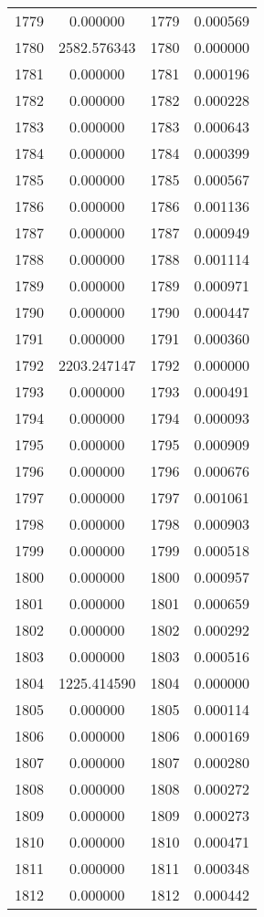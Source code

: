 \documentclass[12pt]{article}
\begin{document}
\begin{longtable}{@{}cccc@{}}
1779 & 0.000000 & 1779 & 0.000569 \\
1780 & 2582.576343 & 1780 & 0.000000 \\
1781 & 0.000000 & 1781 & 0.000196 \\
1782 & 0.000000 & 1782 & 0.000228 \\
1783 & 0.000000 & 1783 & 0.000643 \\
1784 & 0.000000 & 1784 & 0.000399 \\
1785 & 0.000000 & 1785 & 0.000567 \\
1786 & 0.000000 & 1786 & 0.001136 \\
1787 & 0.000000 & 1787 & 0.000949 \\
1788 & 0.000000 & 1788 & 0.001114 \\
1789 & 0.000000 & 1789 & 0.000971 \\
1790 & 0.000000 & 1790 & 0.000447 \\
1791 & 0.000000 & 1791 & 0.000360 \\
1792 & 2203.247147 & 1792 & 0.000000 \\
1793 & 0.000000 & 1793 & 0.000491 \\
1794 & 0.000000 & 1794 & 0.000093 \\
1795 & 0.000000 & 1795 & 0.000909 \\
1796 & 0.000000 & 1796 & 0.000676 \\
1797 & 0.000000 & 1797 & 0.001061 \\
1798 & 0.000000 & 1798 & 0.000903 \\
1799 & 0.000000 & 1799 & 0.000518 \\
1800 & 0.000000 & 1800 & 0.000957 \\
1801 & 0.000000 & 1801 & 0.000659 \\
1802 & 0.000000 & 1802 & 0.000292 \\
1803 & 0.000000 & 1803 & 0.000516 \\
1804 & 1225.414590 & 1804 & 0.000000 \\
1805 & 0.000000 & 1805 & 0.000114 \\
1806 & 0.000000 & 1806 & 0.000169 \\
1807 & 0.000000 & 1807 & 0.000280 \\
1808 & 0.000000 & 1808 & 0.000272 \\
1809 & 0.000000 & 1809 & 0.000273 \\
1810 & 0.000000 & 1810 & 0.000471 \\
1811 & 0.000000 & 1811 & 0.000348 \\
1812 & 0.000000 & 1812 & 0.000442 \\

\end{longtable}
\end{document}
